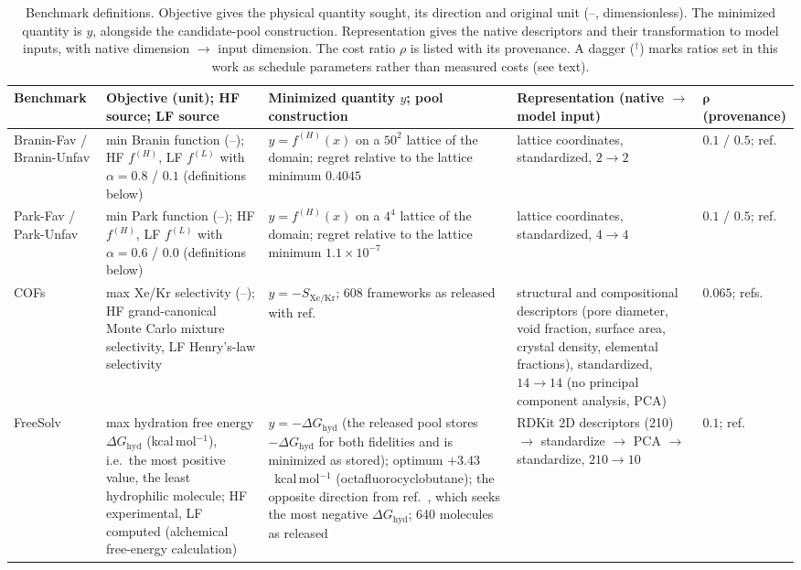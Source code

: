 \begin{table}[h]
\centering
\footnotesize
\caption{Benchmark definitions. Objective gives the physical quantity sought, its direction and original unit (--, dimensionless). The minimized quantity is $y$, alongside the candidate-pool construction. Representation gives the native descriptors and their transformation to model inputs, with native dimension $\to$ input dimension. The cost ratio $\rho$ is listed with its provenance. A dagger ($^{\dagger}$) marks ratios set in this work as schedule parameters rather than measured costs (see text).}
\label{supptab:benchmark_definitions}
\setlength{\tabcolsep}{4pt}%
\begin{tabular}{@{}>{\raggedright\arraybackslash}p{}>{\raggedright\arraybackslash}p{}>{\raggedright\arraybackslash}p{}>{\raggedright\arraybackslash}p{}>{\raggedright\arraybackslash}p{}@{}}
\toprule
\textbf{Benchmark} & \textbf{Objective (unit); HF source; LF source} & \textbf{Minimized quantity $y$; pool construction} & \textbf{Representation (native $\to$ model input)} & $\boldsymbol{\rho}$ \textbf{(provenance)} \\
\midrule
Branin-Fav / Branin-Unfav & min Branin function (--); HF $f^{(H)}$, LF $f^{(L)}$ with $\alpha = 0.8$ / $0.1$ (definitions below) & $y = f^{(H)}(x)$ on a $50^2$ lattice of the domain; regret relative to the lattice minimum $0.4045$ & lattice coordinates, standardized, $2 \to 2$ & $0.1$ / $0.5$; ref.~\citep{sabanza2025best} \\
\addlinespace
Park-Fav / Park-Unfav & min Park function (--); HF $f^{(H)}$, LF $f^{(L)}$ with $\alpha = 0.6$ / $0.0$ (definitions below) & $y = f^{(H)}(x)$ on a $4^4$ lattice of the domain; regret relative to the lattice minimum $1.1\times10^{-7}$ & lattice coordinates, standardized, $4 \to 4$ & $0.1$ / $0.5$; ref.~\citep{sabanza2025best} \\
\addlinespace
COFs & max Xe/Kr selectivity (--); HF grand-canonical Monte Carlo mixture selectivity, LF Henry's-law selectivity~\citep{gantzler2023multifidelity} & $y = -S_{\mathrm{Xe/Kr}}$; 608 frameworks as released with ref.~\citep{sabanza2025best} & 14 structural and compositional descriptors (pore diameter, void fraction, surface area, crystal density, elemental fractions), standardized, $14 \to 14$ (no principal component analysis, PCA) & $0.065$; refs.~\citep{gantzler2023multifidelity,sabanza2025best} \\
\addlinespace
FreeSolv & max hydration free energy $\Delta G_{\mathrm{hyd}}$ (kcal\,mol$^{-1}$), i.e.\ the most positive value, the least hydrophilic molecule; HF experimental, LF computed (alchemical free-energy calculation)~\citep{mobley2014freesolv} & $y = -\Delta G_{\mathrm{hyd}}$ (the released pool stores $-\Delta G_{\mathrm{hyd}}$ for both fidelities and is minimized as stored); optimum $+3.43$~kcal\,mol$^{-1}$ (octafluorocyclobutane); the opposite direction from ref.~\citep{sabanza2025best}, which seeks the most negative $\Delta G_{\mathrm{hyd}}$; 640 molecules as released & RDKit 2D descriptors (210) $\to$ standardize $\to$ PCA $\to$ standardize, $210 \to 10$ & $0.1$; ref.~\citep{sabanza2025best} \\

\end{tabular}
\end{table}
